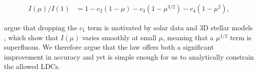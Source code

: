 \begin{align}
I(\mu)/I(1) &= 1 - c_2 (1-\mu) - c_3 (1-\mu^{3/2}) - c_4 (1-\mu^{2}),
\label{eqn:Ising}
\end{align}

\citet{sing:2010} argue that dropping the $c_1$ term is motivated by
solar data \citep{neckel:1994} and 3D stellar models \citep{bigot:2006}, which
show that $I(\mu)$ varies smoothly at small $\mu$, meaning that a $\mu^{1/2}$
term is superfluous. We therefore argue that the \citet{sing:2009} law
offers both a significant improvement in accuracy and yet is simple enough for
us to analytically constrain the allowed LDCs.
